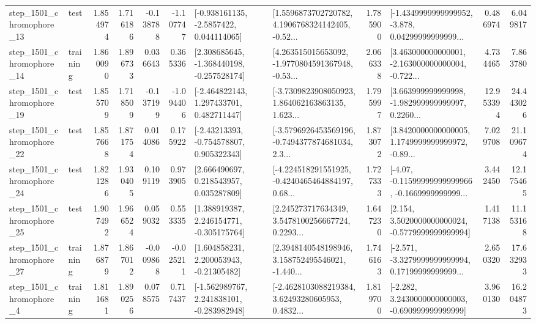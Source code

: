 \begin{tabular}{llrrrrllrlrr}
 step\_1501\_chromophore\_13 &      test &      1.854974 &    1.716186 &     -0.138788 & -1.107747 &     [-0.938161135, -2.5857422, 0.044114065] &  [1.5596873702720782, 4.1906768324142405, -0.52... &       1.785900 &  [-1.4349999999999952, -3.878, 0.04299999999999... &            0.486974 &          6.049817 \\
 step\_1501\_chromophore\_14 &  training &      1.860090 &    1.896733 &      0.036643 &  0.365336 &   [2.308685645, -1.368440198, -0.257528174] &  [4.263515015653092, -1.9770804591367948, -0.53... &       2.066338 &  [3.463000000000001, -2.163000000000004, -0.722... &            4.734465 &          7.863780 \\
 step\_1501\_chromophore\_19 &      test &      1.855709 &    1.718509 &     -0.137199 & -1.094406 &    [-2.464822143, 1.297433701, 0.482711447] &  [-3.7309823908050923, 1.864062163863135, 1.623... &       1.795997 &  [3.663999999999998, -1.982999999999997, 0.2260... &           12.953394 &         24.443026 \\
 step\_1501\_chromophore\_22 &      test &      1.857668 &    1.871754 &      0.014086 &  0.175922 &    [-2.43213393, -0.754578807, 0.905322343] &  [-3.5796926453569196, -0.7494377874681034, 2.3... &       1.873072 &  [3.8420000000000005, 1.1749999999999972, -0.89... &            7.029708 &         21.109674 \\
 step\_1501\_chromophore\_24 &      test &      1.821286 &    1.930405 &      0.109119 &  0.973905 &     [2.666490697, 0.218543957, 0.035287809] &  [-4.224518291551925, -0.4240465464884197, 0.68... &       1.727333 &  [-4.07, -0.11599999999999966, -0.1669999999999... &            3.442450 &         12.175465 \\
 step\_1501\_chromophore\_25 &      test &      1.907492 &    1.966524 &      0.059032 &  0.553335 &    [1.388919387, 2.246154771, -0.305175764] &  [2.245273717634349, 3.5478100256667724, 0.2293... &       1.647230 &   [2.154, 3.5020000000000024, -0.5779999999999994] &            1.417138 &         11.153168 \\
 step\_1501\_chromophore\_27 &  training &      1.876879 &    1.867012 &     -0.009868 & -0.025211 &     [1.604858231, 2.200053943, -0.21305482] &  [2.3948140548198946, 3.158752495546021, -1.440... &       1.746163 &  [-2.571, -3.3279999999999994, 0.17199999999999... &            2.650320 &         17.632933 \\
  step\_1501\_chromophore\_4 &  training &      1.811681 &    1.890256 &      0.078575 &  0.717437 &   [-1.562989767, 2.241838101, -0.283982948] &  [-2.4628103088219384, 3.62493280605953, 0.4832... &       1.819700 &   [-2.282, 3.2430000000000003, -0.690999999999999] &            3.960130 &         16.204873 \\

\end{tabular}
